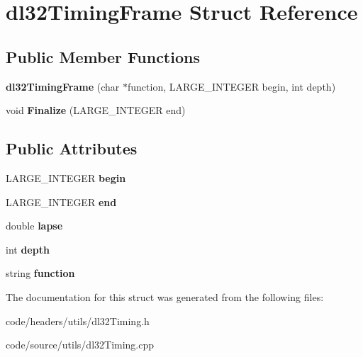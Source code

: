 \hypertarget{structdl32_timing_frame}{\section{dl32\-Timing\-Frame Struct Reference}
\label{structdl32_timing_frame}
}
\subsection*{Public Member Functions}
\begin{DoxyCompactItemize}
\item 
\hypertarget{structdl32_timing_frame_aacf133bf0ab36a5cdba7b49532a971d3}{{\bfseries dl32\-Timing\-Frame} (char $\ast$function, L\-A\-R\-G\-E\-\_\-\-I\-N\-T\-E\-G\-E\-R begin, int depth)}\label{structdl32_timing_frame_aacf133bf0ab36a5cdba7b49532a971d3}

\item 
\hypertarget{structdl32_timing_frame_a455068f74f41e5903018e3331294b494}{void {\bfseries Finalize} (L\-A\-R\-G\-E\-\_\-\-I\-N\-T\-E\-G\-E\-R end)}\label{structdl32_timing_frame_a455068f74f41e5903018e3331294b494}

\end{DoxyCompactItemize}
\subsection*{Public Attributes}
\begin{DoxyCompactItemize}
\item 
\hypertarget{structdl32_timing_frame_ae1278ea7491ce047d5af06ce75d512b9}{L\-A\-R\-G\-E\-\_\-\-I\-N\-T\-E\-G\-E\-R {\bfseries begin}}\label{structdl32_timing_frame_ae1278ea7491ce047d5af06ce75d512b9}

\item 
\hypertarget{structdl32_timing_frame_ab2a12b723005cf8c11055fbbd3850c61}{L\-A\-R\-G\-E\-\_\-\-I\-N\-T\-E\-G\-E\-R {\bfseries end}}\label{structdl32_timing_frame_ab2a12b723005cf8c11055fbbd3850c61}

\item 
\hypertarget{structdl32_timing_frame_a5ef780d3ce475245266909e9888a0d71}{double {\bfseries lapse}}\label{structdl32_timing_frame_a5ef780d3ce475245266909e9888a0d71}

\item 
\hypertarget{structdl32_timing_frame_af846942f52f311c1f220ff236fef7872}{int {\bfseries depth}}\label{structdl32_timing_frame_af846942f52f311c1f220ff236fef7872}

\item 
\hypertarget{structdl32_timing_frame_aede99619d0daf3402f0a9b3d2781a806}{string {\bfseries function}}\label{structdl32_timing_frame_aede99619d0daf3402f0a9b3d2781a806}

\end{DoxyCompactItemize}


The documentation for this struct was generated from the following files\-:\begin{DoxyCompactItemize}
\item 
code/headers/utils/dl32\-Timing.\-h\item 
code/source/utils/dl32\-Timing.\-cpp\end{DoxyCompactItemize}
